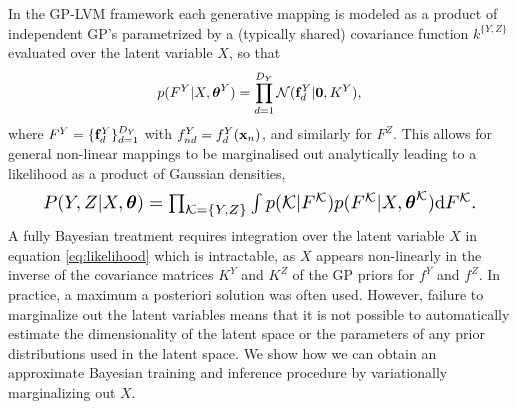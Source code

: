 In the GP-LVM framework each generative mapping is modeled as a
product of independent GP's parametrized by a (typically shared)
covariance function $k^{\{Y,Z\}}$ evaluated over the latent variable
$X$, so that
\begin{equation}
\label{pfx}
p(F^Y|X, \boldsymbol \theta^Y) = \prod_{d=1}^{D_Y} \mathcal{N}(\mathbf{f}^Y_d | \mathbf{0}, K^Y) ,
\end{equation}
where $F^Y = \{\mathbf{f}^Y_d\}_{d=1}^{D_Y}$ with $f^Y_{nd} = f^Y_d(\mathbf{x}_n)$, and
similarly for $F^Z$.
This allows for general non-linear mappings to be marginalised out
analytically leading to a likelihood as a product of Gaussian
densities,
\begin{equation}
\resizebox{.9\hsize}{!}{$P(Y,Z | X,\bftheta) = 
  \prod_{\mathcal{K} = \{Y,Z\}} \int p(\mathcal{K} | F^\mathcal{K})
   p(F^\mathcal{K} | X, \bftheta^\mathcal{K}) \intd F^\mathcal{K}.$} \label{eq:likelihood}
\end{equation}
%
%
A fully Bayesian treatment requires integration over the latent
variable $X$ in equation \eqref{eq:likelihood} which is intractable,
as $X$ appears non-linearly in the inverse of the covariance matrices
$K^Y$ and $K^Z$ of the GP priors for $f^Y$ and $f^Z$. In practice, a
maximum a posteriori solution
\cite{Shon:2006wr,Ek:2007uo,Salzmann:2010vh} was often used. However,
failure to marginalize out the latent variables means that it is not
possible to automatically estimate the dimensionality of the latent space or the
parameters of any prior distributions used in the latent space. We
show how we can obtain an approximate Bayesian training and inference
procedure by variationally marginalizing out $X$. 

